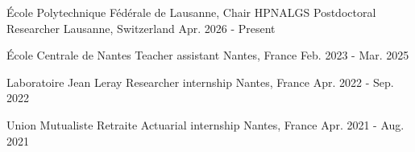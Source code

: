 

\begin{cvcompactentries}

\cvcompactentry
{\'Ecole Polytechnique F\'ed\'erale de Lausanne, Chair HPNALGS} %
{Postdoctoral Researcher} %
{Lausanne, Switzerland} %
{Apr. 2026 - Present} %
{}

\cvcompactentry
{\'Ecole Centrale de Nantes} %
{Teacher assistant} %
{Nantes, France} %
{Feb. 2023 - Mar. 2025} %
{}

\cvcompactentry
{Laboratoire Jean Leray} %
{Researcher internship} %
{Nantes, France} %
{Apr. 2022 - Sep. 2022} %
{}

\cvcompactentry
  {Union Mutualiste Retraite} %
  {Actuarial internship} %
  {Nantes, France} %
  {Apr. 2021 - Aug. 2021} %
  {}

\end{cvcompactentries}
